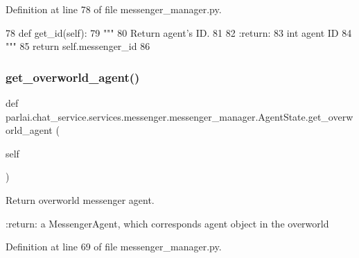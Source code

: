 Definition at line 78 of file messenger\+\_\+manager.\+py.


\begin{DoxyCode}
78     \textcolor{keyword}{def }get\_id(self):
79         \textcolor{stringliteral}{"""}
80 \textcolor{stringliteral}{        Return agent's ID.}
81 \textcolor{stringliteral}{}
82 \textcolor{stringliteral}{        :return:}
83 \textcolor{stringliteral}{            int agent ID}
84 \textcolor{stringliteral}{        """}
85         \textcolor{keywordflow}{return} self.messenger\_id
86 
\end{DoxyCode}
\mbox{\label{classparlai_1_1chat__service_1_1services_1_1messenger_1_1messenger__manager_1_1AgentState_a58d7f5ee92406398cb1a48c31dc5f698}} 
\subsubsection{\texorpdfstring{get\+\_\+overworld\+\_\+agent()}{get\_overworld\_agent()}}
{\footnotesize\ttfamily def parlai.\+chat\+\_\+service.\+services.\+messenger.\+messenger\+\_\+manager.\+Agent\+State.\+get\+\_\+overworld\+\_\+agent (\begin{DoxyParamCaption}\item[{}]{self }\end{DoxyParamCaption})}

\begin{DoxyVerb}Return overworld messenger agent.

:return:
    a MessengerAgent, which corresponds agent object in the overworld
\end{DoxyVerb}
 

Definition at line 69 of file messenger\+\_\+manager.\+py.


